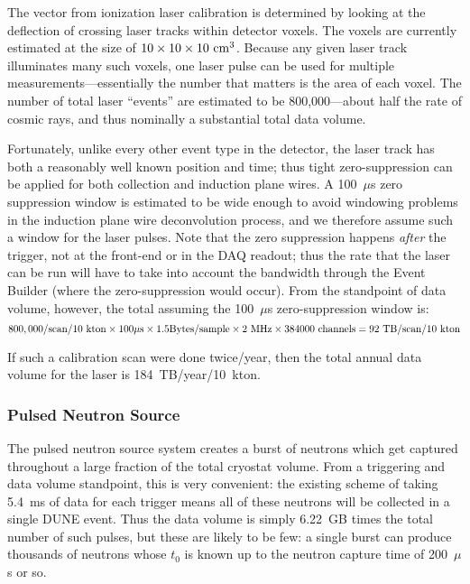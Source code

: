 The \efield vector from ionization laser calibration is determined by looking at the deflection of crossing laser tracks within detector voxels. The voxels are currently estimated at the size of $10\times10\times10~{\rm cm}^3$. Because any given laser track
illuminates many such voxels, one laser pulse can be used for multiple
measurements---essentially the number that matters is the area of each voxel.
The number of total laser ``events'' are estimated to be 800,000---about half the rate of cosmic rays, and thus nominally a substantial total data volume.

Fortunately, unlike every other event type in the detector, the laser track has both a reasonably well known position and time; thus tight zero-suppression can be applied for both collection and induction plane wires. %
A 100~$\mu$s zero suppression window is estimated to be wide enough to
avoid windowing problems in the induction plane wire deconvolution process, and we
therefore assume such a window for the laser pulses. Note that the zero
suppression happens {\it after} the trigger, not at the front-end or in the DAQ
readout; thus the rate that the laser can be run will have to take into account
the bandwidth through the Event Builder (where the zero-suppression would
occur). From the standpoint of data volume, however, the total assuming the
100~$\mu$s zero-suppression window is:
\begin{equation}
800,000/{\rm scan/10~kton} \times 100\mu{\rm s} \times 1.5{\rm Bytes/sample}\times 2~{\rm MHz}\times 384000~{\rm channels}   = 92~{\rm TB/scan/10~kton}   
\end{equation}

If such a calibration scan were done twice/year, then the total annual data volume for the laser is 184~TB/year/10~kton.

\subsubsection{Pulsed Neutron Source}

The pulsed neutron source system creates a burst of neutrons which
get captured throughout a large fraction of the total cryostat volume. From a triggering and data volume
standpoint, this is very convenient: the existing scheme of taking 5.4~ms of data for each trigger means all of these neutrons will be collected in a single DUNE event. Thus the data volume is simply 6.22~GB times the total number of such pulses, but these are likely to be few: a single burst can produce thousands of neutrons whose $t_0$ is known up to the neutron capture time of 200~$\mu$s or so.


